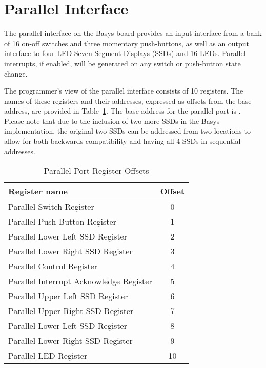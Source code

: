 \section{Parallel Interface}

The parallel interface on the Basys board provides an input interface
from a bank of 16 on-off switches and three momentary push-buttons, as
well as an output interface to four LED Seven Segment Displays (SSDs)
and 16 LEDs.
Parallel interrupts, if enabled, will be generated on any switch or
push-button state change.

The programmer's view of the parallel interface consists of 10
registers. The names of these registers and their addresses,
expressed as offsets from the base address, are provided in
Table~\ref{table:parallel_offsets}. The base address for the parallel
port is \src{\LOCPARABASE}. Please note that due to the inclusion of
two more SSDs in the Basys implementation, the original two SSDs can
be addressed from two locations to allow for both backwards compatibility
and having all 4 SSDs in sequential addresses.

\begin{table}[h]
\begin{center}
\begin{tabular}{|l|c|}
\hline
\textbf{Register name} & \textbf{Offset} \\
\hline
Parallel Switch Register & 0 \\
\hline
Parallel Push Button Register & 1 \\
\hline
Parallel Lower Left SSD Register & 2 \\
\hline
Parallel Lower Right SSD Register & 3 \\
\hline
Parallel Control Register & 4 \\
\hline
Parallel Interrupt Acknowledge Register & 5 \\
\hline
Parallel Upper Left SSD Register & 6 \\
\hline
Parallel Upper Right SSD Register & 7 \\
\hline
Parallel Lower Left SSD Register & 8 \\
\hline
Parallel Lower Right SSD Register & 9 \\
\hline
Parallel LED Register & 10 \\
\hline
\end{tabular}
\caption{Parallel Port Register Offsets}
\label{table:parallel_offsets}
\end{center}
\end{table}

